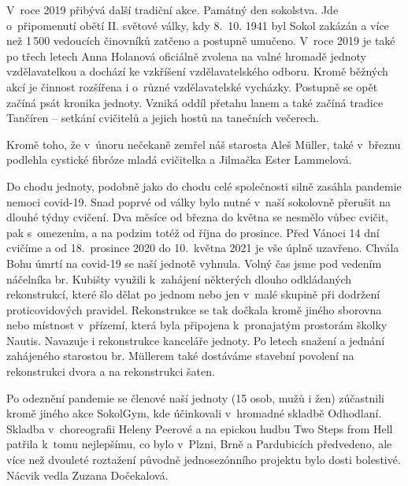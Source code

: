 \documentclass[a5paper, 11pt, twoside]{article}
\begin{document}
V~roce 2019 přibývá další tradiční akce. Památný den sokolstva. Jde
o~připomenutí obětí II. světové války, kdy 8.~10. 1941 byl Sokol zakázán a
více než 1\,500 vedoucích činovníků zatčeno a postupně umučeno. V~roce
2019 je také po třech letech Anna Holanová oficiálně zvolena na valné
hromadě jednoty vzdělavatelkou a dochází ke vzkříšení vzdělavatelského
odboru. Kromě běžných akcí je činnost rozšířena i o~různé vzdělavatelské
vycházky. Postupně se opět začíná psát kronika jednoty. Vzniká oddíl
přetahu lanem a také začíná tradice Tančíren -- setkání cvičitelů a
jejich hostů na tanečních večerech.

{\sloppy Kromě toho, že v~únoru nečekaně zemřel náš starosta Aleš Müller, také
v~březnu podlehla cystické fibróze mladá cvičitelka a Jilmačka Ester
Lammelová.\par}

Do chodu jednoty, podobně jako do chodu celé společnosti silně zasáhla
pandemie nemoci covid-19. Snad poprvé od války bylo nutné v~naší
sokolovně přerušit na dlouhé týdny cvičení. Dva měsíce od března do
května se nesmělo vůbec cvičit, pak s~omezením, a na podzim totéž od
října do prosince. Před Vánoci 14 dní cvičíme a od 18.~prosince 2020 do
10.~května 2021 je vše úplně uzavřeno. Chvála Bohu úmrtí na covid-19 se
naší jednotě vyhnula. Volný čas jsme pod vedením náčelníka br. Kubišty
využili k~zahájení některých dlouho odkládaných rekonstrukcí, které šlo
dělat po jednom nebo jen v~malé skupině při dodržení proticovidových
pravidel. Rekonstrukce se tak dočkala kromě jiného sborovna nebo
místnost v~přízemí, která byla připojena k~pronajatým prostorám školky
Nautis. Navazuje i rekonstrukce kanceláře jednoty. Po letech snažení a
jednání zahájeného starostou br. Müllerem také dostáváme stavební
povolení na rekonstrukci dvora a na rekonstrukci šaten.

Po odeznění pandemie se členové naší jednoty (15 osob, mužů i žen)
zúčastnili kromě jiného akce SokolGym, kde účinkovali v~hromadné skladbě
Odhodlaní. Skladba v~choreografii Heleny Peerové a na epickou hudbu Two
Steps from Hell patřila k~tomu nejlepšímu, co bylo v~Plzni, Brně a
Pardubicích předvedeno, ale více než dvouleté roztažení původně
jednosezónního projektu bylo dosti bolestivé. Nácvik vedla Zuzana
Dočekalová.
\end{document}
